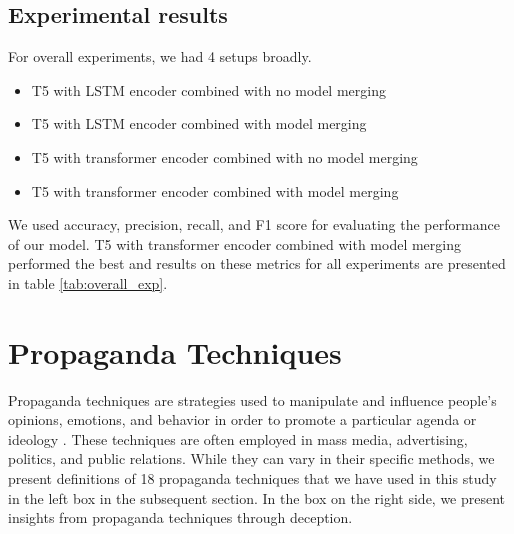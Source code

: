 \subsection{Experimental results} \label{sec:experimental setup}
For overall experiments, we had 4 setups broadly.
\begin{itemize}

\item{T5 with LSTM encoder combined with no model merging}
\item{T5 with LSTM encoder combined with model merging}
\item{T5 with transformer encoder combined with no model merging}
\item{T5 with transformer encoder combined with model merging}

\end{itemize}
We used accuracy, precision, recall, and F1 score for evaluating the performance of our model. T5 with transformer encoder combined with model merging performed the best and results on these metrics for all experiments are presented in table \ref{tab:overall_exp}.




\newpage
\section{Propaganda Techniques}\label{sec: Propaganda}
Propaganda techniques are strategies used to manipulate and influence people's opinions, emotions, and behavior in order to promote a particular agenda or ideology \cite{da-san-martino-etal-2019-fine, martino2020survey}. These techniques are often employed in mass media, advertising, politics, and public relations. While they can vary in their specific methods, we present definitions of 18 propaganda techniques that we have used in this study in the left box in the subsequent section. In the box on the right side, we present insights from propaganda techniques through deception.

















